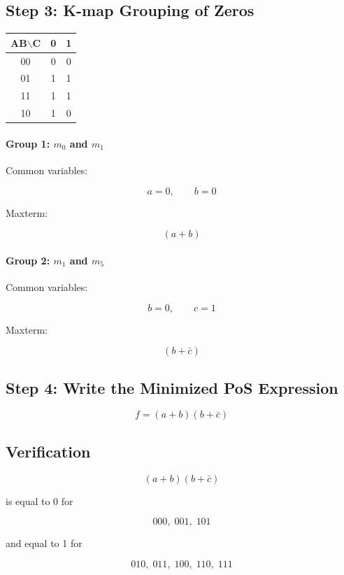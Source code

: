 \documentclass[12pt,a4paper]{article}
\begin{document}
\subsection*{Step 3: K-map Grouping of Zeros}

\begin{center}
\begin{tabular}{|c|c|c|}
\hline
AB$\backslash$C & 0 & 1 \\
\hline
00 & 0 & 0 \\
\hline
01 & 1 & 1 \\
\hline
11 & 1 & 1 \\
\hline
10 & 1 & 0 \\
\hline
\end{tabular}
\end{center}

\paragraph{Group 1: $m_0$ and $m_1$}

Common variables:

$$
a=0,\qquad b=0
$$

Maxterm:

$$
(a+b)
$$

\paragraph{Group 2: $m_1$ and $m_5$}

Common variables:

$$
b=0,\qquad c=1
$$

Maxterm:

$$
(b+\bar{c})
$$

\subsection*{Step 4: Write the Minimized PoS Expression}

$$
\boxed{f=(a+b)(b+\bar{c})}
$$

\subsection*{Verification}

$$
(a+b)(b+\bar{c})
$$

is equal to 0 for

$$
000,\;001,\;101
$$

and equal to 1 for

$$
010,\;011,\;100,\;110,\;111
$$
\end{document}
